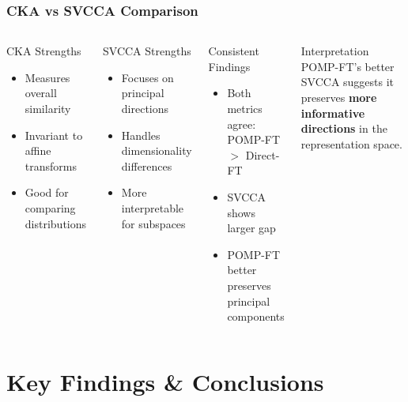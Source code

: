 \documentclass[aspectratio=1610, fontsize=8pt]{beamer}
\begin{document}
\begin{frame}
    \frametitle{CKA vs SVCCA Comparison}
    \begin{columns}
        \begin{block}{CKA Strengths}
            \begin{itemize}
                \item Measures overall similarity
                \item Invariant to affine transforms
                \item Good for comparing distributions
            \end{itemize}
        \end{block}
        
        \begin{block}{SVCCA Strengths}
            \begin{itemize}
                \item Focuses on principal directions
                \item Handles dimensionality differences
                \item More interpretable for subspaces
            \end{itemize}
        \end{block}
        
        \begin{block}{Consistent Findings}
            \begin{itemize}
                \item Both metrics agree: POMP-FT $>$ Direct-FT
                \item SVCCA shows larger gap
                \item POMP-FT better preserves principal components
            \end{itemize}
        \end{block}
        
        \begin{alertblock}{Interpretation}
            POMP-FT's better SVCCA suggests it preserves \textbf{more informative directions} in the representation space.
        \end{alertblock}
    \end{columns}
\end{frame}

\section{Key Findings \& Conclusions}
\end{document}

